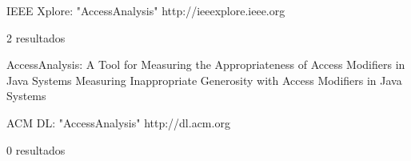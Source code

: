 IEEE Xplore: "AccessAnalysis"
http://ieeexplore.ieee.org

2 resultados

AccessAnalysis: A Tool for Measuring the Appropriateness of Access Modifiers in Java Systems
Measuring Inappropriate Generosity with Access Modifiers in Java Systems

ACM DL: "AccessAnalysis"
http://dl.acm.org

0 resultados
